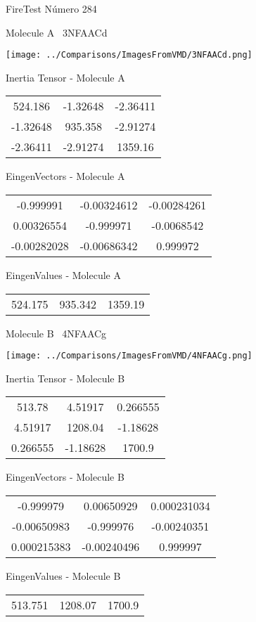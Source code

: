 \vtab[-3cm]
\begin{center}
{\large FireTest \tab Número 284}
\end{center}
\begin{multicols}{2}
\begin{center}

Molecule A \
3NFAACd

\texttt{[image: ../Comparisons/ImagesFromVMD/3NFAACd.png]}

Inertia Tensor - Molecule A \\
\begin{tabular}{|c c c|}
524.186	 & 	-1.32648	 & 	-2.36411	 \\
-1.32648	 & 	935.358	 & 	-2.91274	 \\
-2.36411	 & 	-2.91274	 & 	1359.16
\end{tabular}

\vtab
 EingenVectors - Molecule A     \\
\begin{tabular}{|c c c|}
-0.999991	 & 	-0.00324612	 & 	-0.00284261	 \\
0.00326554	 & 	-0.999971	 & 	-0.0068542	 \\
-0.00282028	 & 	-0.00686342	 & 	0.999972
\end{tabular}

\vtab
 EingenValues - Molecule A     \\
\begin{tabular}{|c c c|}
524.175	 & 	935.342	 & 	1359.19	 \\
\end{tabular}
\columnbreak

Molecule B \
4NFAACg

\texttt{[image: ../Comparisons/ImagesFromVMD/4NFAACg.png]}

Inertia Tensor - Molecule B \\
\begin{tabular}{|c c c|}
513.78	 & 	4.51917	 & 	0.266555	 \\
4.51917	 & 	1208.04	 & 	-1.18628	 \\
0.266555	 & 	-1.18628	 & 	1700.9
\end{tabular}

\vtab
 EingenVectors - Molecule B     \\
\begin{tabular}{|c c c|}
-0.999979	 & 	0.00650929	 & 	0.000231034	 \\
-0.00650983	 & 	-0.999976	 & 	-0.00240351	 \\
0.000215383	 & 	-0.00240496	 & 	0.999997
\end{tabular}

\vtab
 EingenValues - Molecule B     \\
\begin{tabular}{|c c c|}
513.751	 & 	1208.07	 & 	1700.9	 \\
\end{tabular}

\end{center}
\end{multicols}

